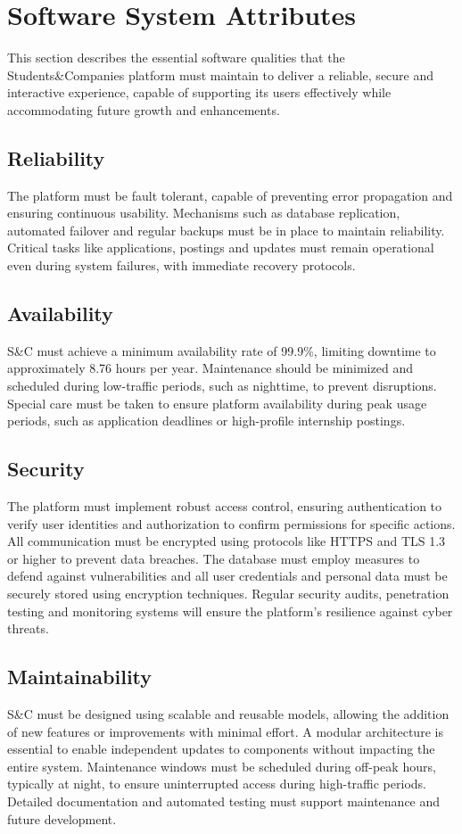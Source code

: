 \section{Software System Attributes}
This section describes the essential software qualities that the Students\&Companies platform must maintain to deliver a reliable, secure and interactive experience, capable of supporting its users effectively while accommodating future growth and enhancements.

\subsection{Reliability}
The platform must be fault tolerant, capable of preventing error propagation and ensuring continuous usability.
Mechanisms such as database replication, automated failover and regular backups must be in place to maintain reliability.
Critical tasks like applications, postings and updates must remain operational even during system failures, with immediate recovery protocols.

\subsection{Availability}
S\&C must achieve a minimum availability rate of 99.9\%, limiting downtime to approximately 8.76 hours per year.
Maintenance should be minimized and scheduled during low-traffic periods, such as nighttime, to prevent disruptions.
Special care must be taken to ensure platform availability during peak usage periods, such as application deadlines or high-profile internship postings.

\subsection{Security}
The platform must implement robust access control, ensuring authentication to verify user identities and authorization to confirm permissions for specific actions.
All communication must be encrypted using protocols like HTTPS and TLS 1.3 or higher to prevent data breaches.
The database must employ measures to defend against vulnerabilities and all user credentials and personal data must be securely stored using encryption techniques.
Regular security audits, penetration testing and monitoring systems will ensure the platform's resilience against cyber threats.

\subsection{Maintainability}
S\&C must be designed using scalable and reusable models, allowing the addition of new features or improvements with minimal effort.
A modular architecture is essential to enable independent updates to components without impacting the entire system.
Maintenance windows must be scheduled during off-peak hours, typically at night, to ensure uninterrupted access during high-traffic periods.
Detailed documentation and automated testing must support maintenance and future development.

